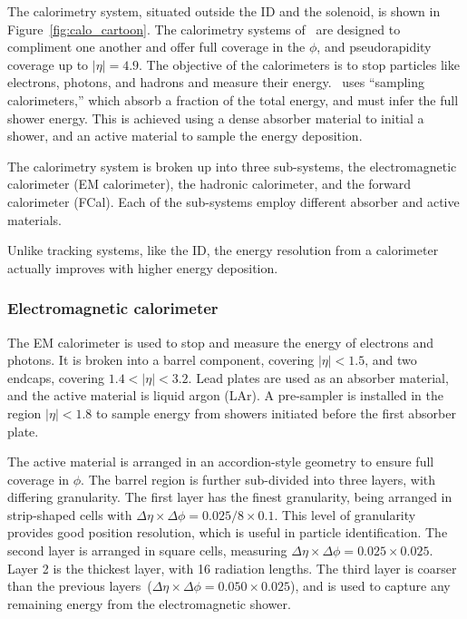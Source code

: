 The calorimetry system, situated outside the ID and the solenoid, is shown
in Figure~\ref{fig:calo_cartoon}.
The calorimetry systems of \atlas\ are designed to compliment one another and
offer full coverage in the $\phi$, and pseudorapidity coverage up to
$|\eta| = 4.9$.
The objective of the calorimeters is to stop particles like electrons, photons,
and hadrons and measure their energy.
\atlas\ uses ``sampling calorimeters,'' which absorb a fraction of the total
energy, and must infer the full shower energy.
This is achieved using a dense absorber material to initial a shower, and
an active material to sample the energy deposition.

The calorimetry system is broken up into three sub-systems, the electromagnetic
calorimeter (EM calorimeter), the hadronic calorimeter, and the forward
calorimeter (FCal).
Each of the sub-systems employ different absorber and active materials.

Unlike tracking systems, like the ID, the energy resolution from a calorimeter
actually improves with higher energy deposition.

\FloatBarrier
\subsubsection{Electromagnetic calorimeter} 
\label{sec:ecal}

The EM calorimeter is used to stop and measure the energy of electrons and
photons.
It is broken into a barrel component, covering $|\eta| < 1.5$, and two endcaps,
covering $1.4 < |\eta| < 3.2$.
Lead plates are used as an absorber material, and the active material is
liquid argon (LAr).
A pre-sampler is installed in the region $|\eta| < 1.8$ to sample energy from
showers initiated before the first absorber plate.

The active material is arranged in an accordion-style geometry to ensure full
coverage in $\phi$.
The barrel region is further sub-divided into three layers, with differing
granularity.
The first layer has the finest granularity, being arranged in strip-shaped
cells with $\Delta\eta \times \Delta\phi = 0.025/8 \times 0.1$.
This level of granularity provides good position resolution, which is useful
in particle identification.
The second layer is arranged in square cells, measuring
$\Delta\eta \times \Delta\phi = 0.025 \times 0.025$.
Layer 2 is the thickest layer, with 16 radiation lengths.
The third layer is coarser than the previous
layers~($\Delta\eta \times \Delta\phi = 0.050 \times 0.025$), and is used to
capture any remaining energy from the electromagnetic shower.

